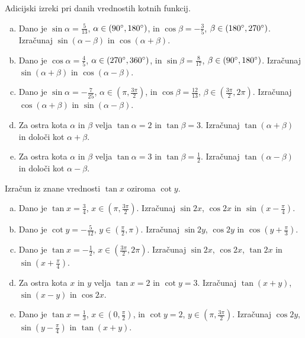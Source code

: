 \documentclass[a4paper,12pt]{letter}
\newcounter{tocke}
\begin{document}
\begin{naloga}[\hfill $\tockeG$] \addtocounter{tocke}{\numexpr\tockeG\relax}
Adicijski izreki pri danih vrednostih kotnih funkcij.
\begin{enumerate}[a)]
\item Dano je $\sin\alpha=\frac{5}{13}$, $\alpha\in(90\degree,180\degree)$, in $\cos\beta=-\frac35$, $\beta\in(180\degree,270\degree)$. Izra\v{c}unaj $\sin(\alpha-\beta)$ in $\cos(\alpha+\beta)$.
\item Dano je $\cos\alpha=\frac45$, $\alpha\in(270\degree,360\degree)$, in $\sin\beta=\frac{8}{17}$, $\beta\in(90\degree,180\degree)$. Izra\v{c}unaj $\sin(\alpha+\beta)$ in $\cos(\alpha-\beta)$.
\item Dano je $\sin\alpha=-\frac{7}{25}$, $\alpha\in\left(\pi,\frac{3\pi}{2}\right)$, in $\cos\beta=\frac{12}{13}$, $\beta\in\left(\frac{3\pi}{2},2\pi\right)$. Izra\v{c}unaj $\cos(\alpha+\beta)$ in $\sin(\alpha-\beta)$.
\item Za ostra kota $\alpha$ in $\beta$ velja $\tan\alpha=2$ in $\tan\beta=3$. Izra\v{c}unaj $\tan(\alpha+\beta)$ in dolo\v{c}i kot $\alpha+\beta$.
\item Za ostra kota $\alpha$ in $\beta$ velja $\tan\alpha=3$ in $\tan\beta=\frac12$. Izra\v{c}unaj $\tan(\alpha-\beta)$ in dolo\v{c}i kot $\alpha-\beta$.
\end{enumerate}
\end{naloga}

\begin{naloga}[\hfill $\tockeH$] \addtocounter{tocke}{\numexpr\tockeH\relax}
Izra\v{c}un iz znane vrednosti $\tan x$ oziroma $\cot y$.
\begin{enumerate}[a)]
\item Dano je $\tan x=\frac34$, $x\in\left(\pi,\frac{3\pi}{2}\right)$. Izra\v{c}unaj $\sin2x$, $\cos2x$ in $\sin\left(x-\frac{\pi}{4}\right)$.
\item Dano je $\cot y=-\frac{5}{12}$, $y\in\left(\frac{\pi}{2},\pi\right)$. Izra\v{c}unaj $\sin2y$, $\cos2y$ in $\cos\left(y+\frac{\pi}{3}\right)$.
\item Dano je $\tan x=-\frac12$, $x\in\left(\frac{3\pi}{2},2\pi\right)$. Izra\v{c}unaj $\sin2x$, $\cos2x$, $\tan2x$ in $\sin\left(x+\frac{\pi}{4}\right)$.
\item Za ostra kota $x$ in $y$ velja $\tan x=2$ in $\cot y=3$. Izra\v{c}unaj $\tan(x+y)$, $\sin(x-y)$ in $\cos2x$.
\item Dano je $\tan x=\frac13$, $x\in\left(0,\frac{\pi}{2}\right)$, in $\cot y=2$, $y\in\left(\pi,\frac{3\pi}{2}\right)$. Izra\v{c}unaj $\cos2y$, $\sin\left(y-\frac{\pi}{4}\right)$ in $\tan(x+y)$.
\end{enumerate}
\end{naloga}
\end{document}
